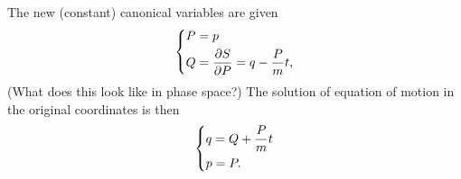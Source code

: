 \documentclass{article}
\begin{document}
        The new (constant) canonical variables are given 
        \begin{equation*}
            \begin{dcases}
                P = p \\
                Q = \pdv{S}{P} = q - \frac{P}{m}t,
            \end{dcases}
        \end{equation*}
        (What does this look like in phase space?) The solution of equation of motion in the original coordinates is then
        \begin{equation*}
        \begin{dcases*}
            q = Q + \frac{P}{m}t \\
            p = P.
        \end{dcases*}
        \end{equation*}

    
\end{document}
